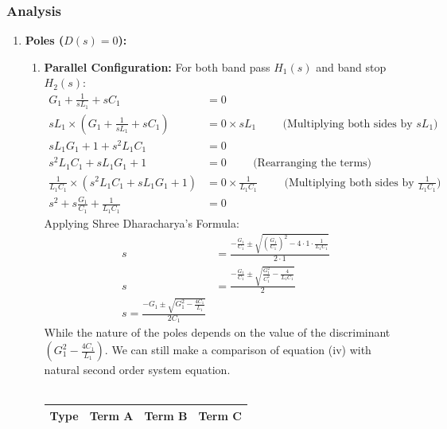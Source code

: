 \subsubsection{Analysis}
\begin{enumerate}
  \item \textbf{Poles (\(D(s) = 0\)):} \\
    \begin{enumerate}
      \item \textbf{Parallel Configuration:}
        For both band pass \(H_1(s)\) and band stop \(H_2(s)\):
        \begin{align*}
          G_1 + \frac{1}{sL_1} + sC_1 &= 0 \\
          sL_1 \times \left( G_1 + \frac{1}{sL_1} + sC_1 \right) &= 0 \times sL_1 \hspace{1cm} \text{(Multiplying both sides by \(sL_1\))} \\
          sL_1 G_1 + 1 + s^2 L_1 C_1 &= 0 \\
          s^2 L_1 C_1 + s L_1 G_1 + 1 &= 0 \hspace{1cm} \text{(Rearranging the terms)} \\
          \frac{1}{L_1 C_1} \times \left( s^2 L_1 C_1 + s L_1 G_1 + 1 \right) &= 0 \times \frac{1}{L_1 C_1} \hspace{1cm} \text{(Multiplying both sides by \(\frac{1}{L_1 C_1}\))} \\
          s^2 + s \frac{G_1}{C_1} + \frac{1}{L_1 C_1} &= 0 \tag{4}
        \end{align*}
        Applying Shree Dharacharya's Formula:
        \begin{align*}
          s &= \frac{-\frac{G_1}{C_1} \pm \sqrt{\left(\frac{G_1}{C_1}\right)^2 - 4 \cdot 1 \cdot \frac{1}{L_1 C_1}}}{2 \cdot 1} \\
          s &= \frac{-\frac{G_1}{C_1} \pm \sqrt{\frac{G_1^2}{C_1^2} - \frac{4}{L_1 C_1}}}{2} \\
          s = \frac{-G_1 \pm \sqrt{G_1^2 - \frac{4 C_1}{L_1}}}{2 C_1}
        \end{align*}
        While the nature of the poles depends on the value of the
        discriminant \(\left(G_1^2 - \frac{4 C_1}{L_1}\right)\).
        We can still make a comparison of equation (iv) with natural
        second order system equation.\\ \\
        \begin{tabularx}{\linewidth}{|X|X|X|X|} \hline
          Type & Term A & Term B & Term C \\ \hline

\end{tabularx}
\end{enumerate}
\end{enumerate}
